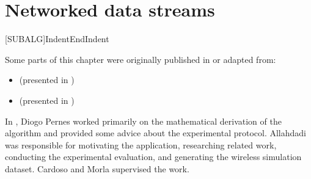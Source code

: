 
\chapter{Networked data streams}


\label{chp:networked_data_streams}


[SUBALG]{Indent}{EndIndent}{}{\algorithmicend\ }%

\begin{tcolorbox}
    \small{
    Some parts of this chapter were originally published in or adapted from:
    \begin{itemize}
        \item[] \cite{SOHMMM}  (presented in )
        \item[] \cite{SpaMHMM}  (presented in )
    \end{itemize}

    In \cite{SOHMMM}, Diogo Pernes worked primarily on the mathematical derivation of the algorithm and provided some advice about the experimental protocol. Allahdadi was responsible for motivating the application, researching related work, conducting the experimental evaluation, and generating the wireless simulation dataset. Cardoso and Morla supervised the work.
    }
\end{tcolorbox}

